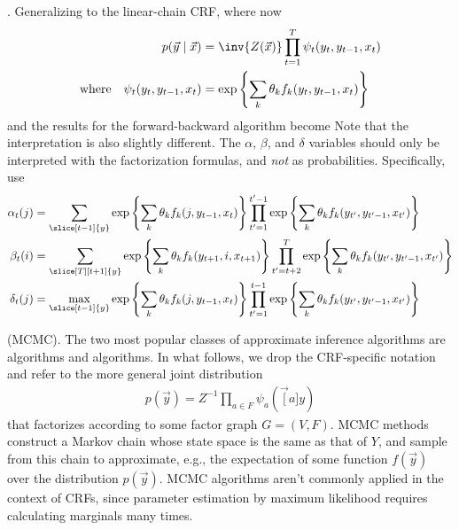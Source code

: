 \documentclass[11pt]{article}
\begin{document}
\myspace
\p {}. Generalizing to the linear-chain CRF, where now
\begin{align}
p(\vec y \mid \vec x) &= \inv{Z(\vec x)} \prod_{t = 1}^{T} \psi_t(y_t, y_{t - 1}, x_t) \\
\text{where}\quad \psi_t(y_t, y_{t - 1}, x_t) &= \exp \left\{    
\sum_k \theta_k f_k(y_t, y_{t -1}, x_t) \right\}
\end{align}
and the results for the forward-backward algorithm become
Note that the interpretation is also slightly different. The $\alpha$, $\beta$, and $\delta$ variables should only be interpreted with the factorization formulas, and \textit{not} as probabilities. Specifically, use
\begin{align}
\alpha_t(j) 
&= \sum_{\slice[t-1]{y}} \exp \left\{\sum_k \theta_k f_k(j, y_{t -1}, x_t) \right\} 
\prod_{t' = 1}^{t' - 1} \exp \left\{\sum_k \theta_k f_k(y_{t'}, y_{t' -1}, x_{t'}) \right\}  \\
\beta_t(i) &= \sum_{\slice[T][t+1]{y}}  \exp \left\{\sum_k \theta_k f_k(y_{t+1}, i, x_{t+1}) \right\} \prod_{t' = t+2}^{T}  \exp \left\{\sum_k \theta_k f_k(y_{t'}, y_{t' -1}, x_{t'}) \right\}  \\
\delta_t(j) &= \max_{\slice[t-1]{y}}  \exp \left\{\sum_k \theta_k f_k(j, y_{t-1}, x_t) \right\} \prod_{t' = 1}^{t - 1}  \exp \left\{\sum_k \theta_k f_k(y_{t'}, y_{t' -1}, x_{t'}) \right\} 
\end{align}


\myspace 
\p {} (MCMC). The two most popular classes of approximate inference algorithms are  algorithms and  algorithms. In what follows, we drop the CRF-specific notation and refer to the more general joint distribution
\begin{align}
p(\vec y) = Z^{-1} \prod_{a \in F} \psi_a(\vec[a]{y})
\end{align}
that factorizes according to some factor graph $G = (V, F)$. MCMC methods construct a Markov chain whose state space is the same as that of $Y$, and sample from this chain to approximate, e.g., the expectation of some function $f(\vec y)$ over the distribution $p(\vec y)$. MCMC algorithms aren't commonly applied in the context of CRFs, since parameter estimation by maximum likelihood requires calculating marginals many times. 
\end{document}
